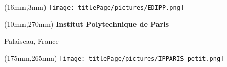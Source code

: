 \label{lastPageLayout}

\pagestyle{empty}

\begin{textblock*}{61mm}(16mm,3mm)
    \noindent\texttt{[image: titlePage/pictures/EDIPP.png]}
\end{textblock*}

\begin{center}
\end{center}

\vspace*{0mm}

\begin{center}
\end{center}


\begin{textblock*}{161mm}(10mm,270mm)
    \color{black}
    {\noindent\textbf{Institut Polytechnique de Paris}}
    
     Palaiseau, France 
\end{textblock*}

\begin{textblock*}{20mm}(175mm,265mm)
\texttt{[image: titlePage/pictures/IPPARIS-petit.png]}
\end{textblock*}